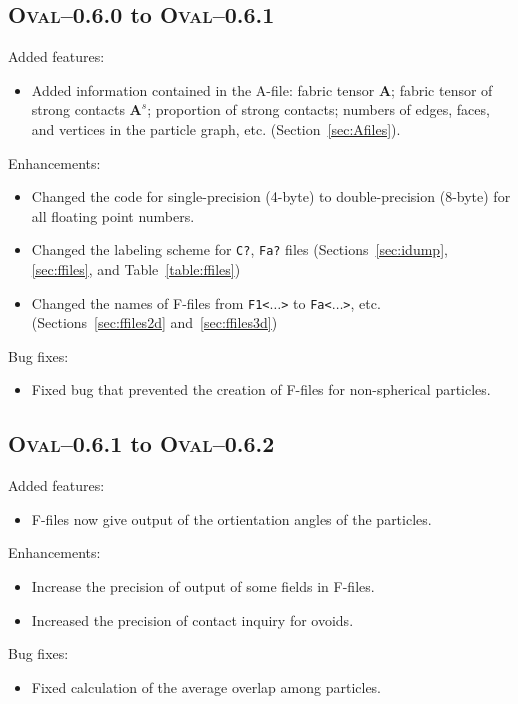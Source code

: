 \documentclass[letterpaper,11pt]{article}
\newcommand{\Oval}{\textsc{Oval}}
\begin{document}
\subsection{\Oval--0.6.0 to \Oval--0.6.1}\label{sec:oval06_to_oval061}
Added features:
\begin{itemize}
\item
Added information contained in the A-file:
fabric tensor $\mathbf{A}$; fabric tensor of strong contacts $\mathbf{A}^{s}$;
proportion of strong contacts; numbers of edges, faces, and vertices
in the particle graph, etc.
(Section~\ref{sec:Afiles}).
\end{itemize}
%
Enhancements:
\begin{itemize}
\item
Changed the code for single-precision (4-byte) to double-precision
(8-byte) for all floating point numbers.
\item
Changed the labeling scheme for \texttt{C?}, \texttt{Fa?} files
(Sections~\ref{sec:idump}, \ref{sec:ffiles}, and Table~\ref{table:ffiles})
\item
Changed the names of F-files from \texttt{F1<}$\ldots$\texttt{>} 
to \texttt{Fa<}$\ldots$\texttt{>}, etc.
(Sections~\ref{sec:ffiles2d} and~\ref{sec:ffiles3d})
\end{itemize}
Bug fixes:
\begin{itemize}
\item
Fixed bug that prevented the creation of F-files for non-spherical particles.
\end{itemize}
%
%
\subsection{\Oval--0.6.1 to \Oval--0.6.2}\label{sec:oval061_to_oval062}
Added features:
\begin{itemize}
\item
F-files now give output of the ortientation angles of the particles.
\end{itemize}
%
Enhancements:
\begin{itemize}
\item
Increase the precision of output of some fields in F-files.
\item
Increased the precision of contact inquiry for ovoids.
\end{itemize}
%
Bug fixes:
\begin{itemize}
\item
Fixed calculation of the average overlap among particles.
\end{itemize}
%
\end{document}
